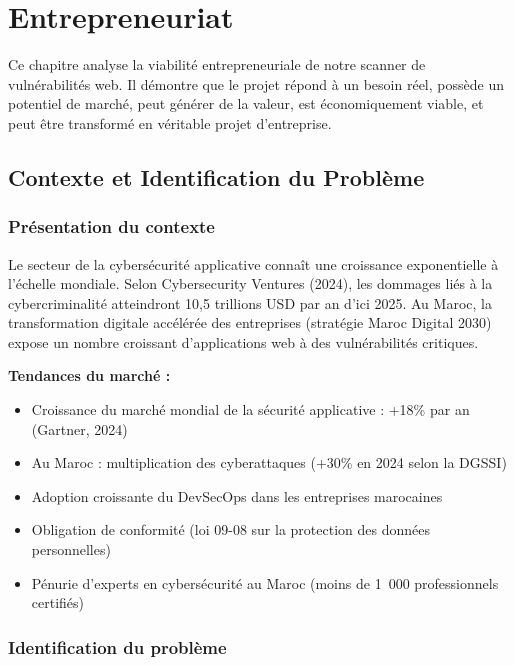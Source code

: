 \documentclass[12pt,a4paper]{report}
\begin{document}
\chapter{Entrepreneuriat}

Ce chapitre analyse la viabilité entrepreneuriale de notre scanner de vulnérabilités web.
Il démontre que le projet répond à un besoin réel, possède un potentiel de marché,
peut générer de la valeur, est économiquement viable, et peut être transformé en
véritable projet d'entreprise.

\section{Contexte et Identification du Problème}

\subsection{Présentation du contexte}

Le secteur de la cybersécurité applicative connaît une croissance exponentielle à l'échelle mondiale.
Selon Cybersecurity Ventures (2024), les dommages liés à la cybercriminalité atteindront
10,5 trillions USD par an d'ici 2025. Au Maroc, la transformation digitale accélérée des entreprises
(stratégie Maroc Digital 2030) expose un nombre croissant d'applications web à des vulnérabilités critiques.

\textbf{Tendances du marché :}
\begin{itemize}
  \item Croissance du marché mondial de la sécurité applicative : +18\% par an (Gartner, 2024)
  \item Au Maroc : multiplication des cyberattaques (+30\% en 2024 selon la DGSSI)
  \item Adoption croissante du DevSecOps dans les entreprises marocaines
  \item Obligation de conformité (loi 09-08 sur la protection des données personnelles)
  \item Pénurie d'experts en cybersécurité au Maroc (moins de 1~000 professionnels certifiés)
\end{itemize}

\subsection{Identification du problème}
\end{document}
